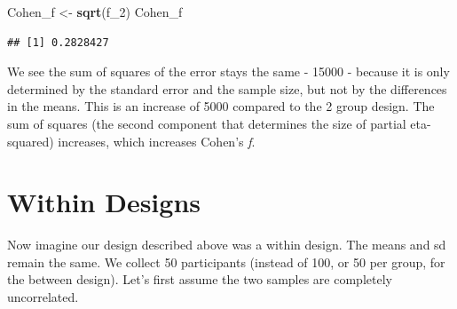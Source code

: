 \documentclass[]{book}
\newenvironment{Shaded}{\begin{snugshade}}{\end{snugshade}}
\newcommand{\CommentTok}[1]{\textcolor[rgb]{0.56,0.35,0.01}{\textit{#1}}}
\newcommand{\DataTypeTok}[1]{\textcolor[rgb]{0.13,0.29,0.53}{#1}}
\newcommand{\DecValTok}[1]{\textcolor[rgb]{0.00,0.00,0.81}{#1}}
\newcommand{\KeywordTok}[1]{\textcolor[rgb]{0.13,0.29,0.53}{\textbf{#1}}}
\newcommand{\NormalTok}[1]{#1}
\newcommand{\OperatorTok}[1]{\textcolor[rgb]{0.81,0.36,0.00}{\textbf{#1}}}
\newcommand{\StringTok}[1]{\textcolor[rgb]{0.31,0.60,0.02}{#1}}
\begin{document}
\begin{Shaded}
\begin{Highlighting}[]
\NormalTok{Cohen_f <-}\StringTok{ }\KeywordTok{sqrt}\NormalTok{(f_}\DecValTok{2}\NormalTok{)}
\NormalTok{Cohen_f}
\end{Highlighting}
\end{Shaded}

\begin{verbatim}
## [1] 0.2828427
\end{verbatim}

We see the sum of squares of the error stays the same - 15000 - because it is only determined by the standard error and the sample size, but not by the differences in the means. This is an increase of 5000 compared to the 2 group design. The sum of squares (the second component that determines the size of partial eta-squared) increases, which increases Cohen's \emph{f}.

\hypertarget{within-designs}{%
\section{Within Designs}\label{within-designs}}

Now imagine our design described above was a within design. The means and sd remain the same. We collect 50 participants (instead of 100, or 50 per group, for the between design). Let's first assume the two samples are completely uncorrelated.

\begin{Shaded}
\end{Shaded}
\end{document}
